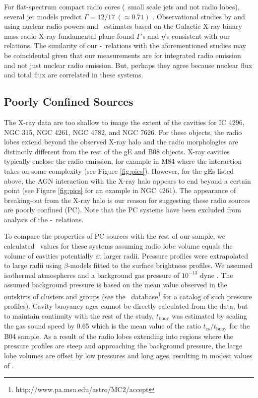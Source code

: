 \documentclass{emulateapj}
\begin{document}
For flat-spectrum compact radio cores (\ie\ small scale jets and not
radio lobes), several jet models predict $\Gamma = 12/17 ~(\approx
0.71)$ \citep{1979ApJ...232...34B, 1995A&A...293..665F,
  2003MNRAS.343L..59H}. Observational studies by
\citet{2005ApJ...633..384H} and \citet{2007MNRAS.381..589M} using
nuclear radio powers and \pjet\ estimates based on the Galactic X-ray
binary mass-radio-X-ray fundamental plane \citep{2003MNRAS.344...60G,
  2003MNRAS.345.1057M} found $\Gamma$'s and $\eta$'s consistent with
our relations. The similarity of our \pjet-\prad\ relations with the
aforementioned studies may be coincidental given that our measurements
are for integrated radio emission and not just nuclear radio
emission. But, perhaps they agree because nuclear flux and total flux
are correlated in these systems.

\subsection{Poorly Confined Sources}
\label{sec:jet}

The X-ray data are too shallow to image the extent of the cavities for
IC 4296, NGC 315, NGC 4261, NGC 4782, and NGC 7626. For these objects,
the radio lobes extend beyond the observed X-ray halo and the radio
morphologies are distinctly different from the rest of the gE and B08
objects. X-ray cavities typically enclose the radio emission, for
example in M84 \citep{2008ApJ...686..911F} where the interaction takes
on some complexity (see Figure \ref{fig:pics}). However, for the gEs
listed above, the AGN interaction with the X-ray halo appears to end
beyond a certain point (see Figure \ref{fig:pics} for an example in
NGC 4261). The appearance of breaking-out from the X-ray halo is our
reason for suggesting these radio sources are poorly confined
(PC). Note that the PC systems have been excluded from analysis of the
\pjet-\prad\ relations.

To compare the properties of PC sources with the rest of our sample,
we calculated \pcav\ values for these systems assuming radio lobe
volume equals the volume of cavities potentially at larger
radii. Pressure profiles were extrapolated to large radii using
$\beta$-models \citep{betamodel} fitted to the surface brightness
profiles. We assumed isothermal atmospheres and a background gas
pressure of $10^{-13}$ dyne \pcmsq. The assumed background pressure is
based on the mean value observed in the outskirts of clusters and
groups (see the
\accept\ database\footnote{http://www.pa.msu.edu/astro/MC2/accept} for
a catalog of such pressure profiles). Cavity buoyancy ages cannot be
directly calculated from the data, but to maintain continuity with the
rest of the study, $t_{\mathrm{buoy}}$ was estimated by scaling the
gas sound speed by 0.65 which is the mean value of the ratio
$t_{\mathrm{cs}}/t_{\mathrm{buoy}}$ for the B04 sample. As a result of
the radio lobes extending into regions where the pressure profiles are
steep and approaching the background pressure, the large lobe volumes
are offset by low pressures and long ages, resulting in modest values
of \pcav.
\end{document}
